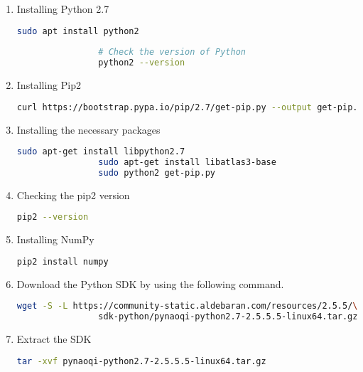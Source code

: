 \documentclass{CSSRforAfrica}
\begin{document}
{{\begin{enumerate}
				\item Installing Python 2.7 
				\begin{lstlisting}[style=withoutNumbering, language=bash]
				sudo apt install python2
				
				# Check the version of Python
				python2 --version
				\end{lstlisting}
				
				\item Installing Pip2 
				\begin{lstlisting}[style=withoutNumbering, language=bash]
				curl https://bootstrap.pypa.io/pip/2.7/get-pip.py --output get-pip.py
				\end{lstlisting}
				
				\item Installing the necessary packages
				
				\begin{lstlisting}[style=withoutNumbering, language=bash]
				sudo apt-get install libpython2.7
				sudo apt-get install libatlas3-base 
				sudo python2 get-pip.py
				\end{lstlisting}
				
				\item Checking the pip2 version
				\begin{lstlisting}[style=withoutNumbering, language=bash]
				pip2 --version
				\end{lstlisting}
				
				\item Installing NumPy
				\begin{lstlisting}[style=withoutNumbering, language=bash]
				pip2 install numpy
				\end{lstlisting}
				
				\item Download the Python SDK by using the following command. 
				\begin{lstlisting}[style=withoutNumbering, language=bash]
				wget -S -L https://community-static.aldebaran.com/resources/2.5.5/\
				sdk-python/pynaoqi-python2.7-2.5.5.5-linux64.tar.gz
				\end{lstlisting}
				
				\item Extract the SDK
				\begin{lstlisting}[style=withoutNumbering, language=bash]
				tar -xvf pynaoqi-python2.7-2.5.5.5-linux64.tar.gz
				\end{lstlisting}
				
				\newpage
				

\end{enumerate}}}
\end{document}
